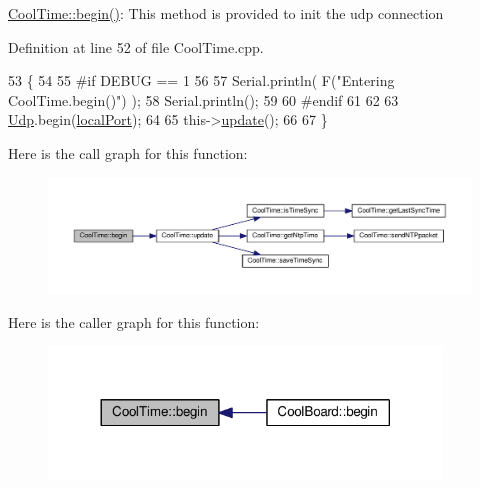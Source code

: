 \hyperlink{class_cool_time_ab1976cf718b950bc31e003c3323b8adb}{Cool\+Time\+::begin()}\+: This method is provided to init the udp connection 

Definition at line 52 of file Cool\+Time.\+cpp.


\begin{DoxyCode}
53 \{
54 
55 \textcolor{preprocessor}{#if DEBUG == 1 }
56 
57     Serial.println( F(\textcolor{stringliteral}{"Entering CoolTime.begin()"}) );
58     Serial.println();
59 
60 \textcolor{preprocessor}{#endif }
61 
62 
63     \hyperlink{class_cool_time_a4e23216a8121ca79d0fb019f30884b92}{Udp}.begin(\hyperlink{class_cool_time_a2f777da44d7ba678be8185299e9b49d1}{localPort});
64     
65     this->\hyperlink{class_cool_time_aae601f795452cfa48d9fb337aed483a8}{update}();
66     
67 \}
\end{DoxyCode}
Here is the call graph for this function\+:\nopagebreak
\begin{figure}[H]
\begin{center}
\leavevmode
\includegraphics[width=350pt]{d6/d49/class_cool_time_ab1976cf718b950bc31e003c3323b8adb_cgraph}
\end{center}
\end{figure}
Here is the caller graph for this function\+:\nopagebreak
\begin{figure}[H]
\begin{center}
\leavevmode
\includegraphics[width=296pt]{d6/d49/class_cool_time_ab1976cf718b950bc31e003c3323b8adb_icgraph}
\end{center}
\end{figure}
\mbox{\label{class_cool_time_a87c28260c1bc77091162cbcf1ee2e129}} 
